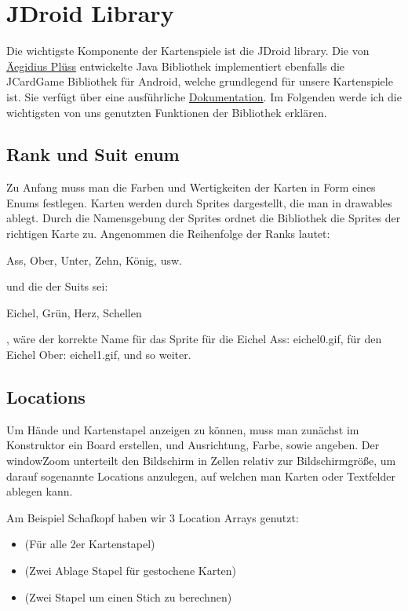 \section{JDroid Library}
\sectionauthor{\philipp}

Die wichtigste Komponente der Kartenspiele ist die JDroid library. Die von
\href{http://www.aplu.ch/home/apluhomex.jsp?site=99}{Äegidius Plüss} entwickelte
Java Bibliothek implementiert ebenfalls die JCardGame Bibliothek für Android,
welche grundlegend für unsere Kartenspiele ist. Sie verfügt über eine
ausführliche
\href{http://www.java-online.ch/gamegrid/index.php?inhalt_links=navigation.inc.php&inhalt_mitte=iframedoc1.html}{Dokumentation}.
Im Folgenden werde ich die wichtigsten von uns genutzten Funktionen der
Bibliothek erklären.

\subsection{Rank und Suit enum}

Zu Anfang muss man die Farben und Wertigkeiten der Karten in Form eines Enums
festlegen. Karten werden durch Sprites dargestellt, die man in drawables ablegt.
Durch die Namensgebung der Sprites ordnet die Bibliothek die Sprites der
richtigen Karte zu. Angenommen die Reihenfolge der Ranks lautet:

Ass, Ober, Unter, Zehn, König, usw.

und die der Suits sei:

Eichel, Grün, Herz, Schellen

, wäre der korrekte Name für das Sprite für die Eichel Ass: eichel0.gif, für den
Eichel Ober: eichel1.gif, und so weiter.

\subsection{Locations}

Um Hände und Kartenstapel anzeigen zu können, muss man zunächst im Konstruktor
ein Board erstellen, und Ausrichtung, Farbe, sowie 
angeben. Der windowZoom unterteilt den Bildschirm in Zellen relativ zur
Bildschirmgröße, um darauf sogenannte Locations anzulegen, auf welchen man
Karten oder Textfelder ablegen kann.

Am Beispiel Schafkopf haben wir 3 Location Arrays genutzt:

\begin{itemize}
	\item {} (Für alle 2er Kartenstapel)
	\item {} (Zwei Ablage Stapel für gestochene Karten)
	\item {} (Zwei Stapel um einen Stich zu berechnen)
\end{itemize}

